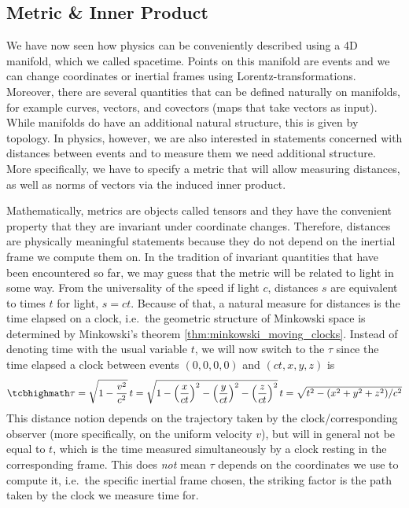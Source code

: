 		\subsection{Metric \& Inner Product}
We have now seen how physics can be conveniently described using a 4D manifold, which we called spacetime. Points on this manifold are events and we can change coordinates or inertial frames using Lorentz-transformations. Moreover, there are several quantities that can be defined naturally on manifolds, for example curves, vectors, and covectors (maps that take vectors as input). While manifolds do have an additional natural structure, this is given by topology. In physics, however, we are also interested in statements concerned with distances between events and to measure them we need additional structure. More specifically, we have to specify a metric that will allow measuring distances, as well as norms of vectors via the induced inner product.


Mathematically, metrics are objects called tensors and they have the convenient property that they are invariant under coordinate changes. Therefore, distances are physically meaningful statements because they do not depend on the inertial frame we compute them on. In the tradition of invariant quantities that have been encountered so far, we may guess that the metric will be related to light in some way. From the universality of the speed if light $c$, distances $s$ are equivalent to times $t$ for light, $s = c t$. Because of that, a natural measure for distances is the time elapsed on a clock, i.e.~the geometric structure of Minkowski space is determined by Minkowski's theorem \ref{thm:minkowski_moving_clocks}. Instead of denoting time with the usual variable $t$, we will now switch to the  $\tau$ since the time elapsed a clock between events $(0, 0, 0, 0)$ and $(ct, x, y, z)$ is
\begin{equation}\label{eq:proper_time_uniform}
	\eqbox{
	\tau = \sqrt{1 - \frac{v^2}{c^2}} \, t = \sqrt{1 - \qty(\frac{x}{ct})^2 - \qty(\frac{y}{ct})^2 - \qty(\frac{z}{ct})^2} \, t = \sqrt{t^2 - (x^2 + y^2 + z^2) / c^2}
	}
\end{equation}
This distance notion depends on the trajectory taken by the clock/corresponding observer (more specifically, on the uniform velocity $v$), but will in general not be equal to $t$, which is the time measured simultaneously by a clock resting in the corresponding frame. This does \emph{not} mean $\tau$ depends on the coordinates we use to compute it, i.e.~the specific inertial frame chosen, the striking factor is the path taken by the clock we measure time for.



